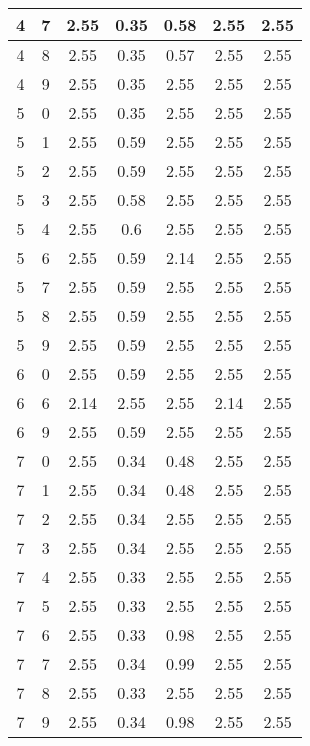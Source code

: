 \begin{longtable}{|c|c||c||c|c||c|c|}
	4 & 7 & 2.55 & 0.35 & 0.58 & 2.55 & 2.55 \\ \hline
	4 & 8 & 2.55 & 0.35 & 0.57 & 2.55 & 2.55 \\ \hline
	4 & 9 & 2.55 & 0.35 & 2.55 & 2.55 & 2.55 \\ \hline
	5 & 0 & 2.55 & 0.35 & 2.55 & 2.55 & 2.55 \\ \hline
	5 & 1 & 2.55 & 0.59 & 2.55 & 2.55 & 2.55 \\ \hline
	5 & 2 & 2.55 & 0.59 & 2.55 & 2.55 & 2.55 \\ \hline
	5 & 3 & 2.55 & 0.58 & 2.55 & 2.55 & 2.55 \\ \hline
	5 & 4 & 2.55 & 0.6 & 2.55 & 2.55 & 2.55 \\ \hline
	5 & 6 & 2.55 & 0.59 & 2.14 & 2.55 & 2.55 \\ \hline
	5 & 7 & 2.55 & 0.59 & 2.55 & 2.55 & 2.55 \\ \hline
	5 & 8 & 2.55 & 0.59 & 2.55 & 2.55 & 2.55 \\ \hline
	5 & 9 & 2.55 & 0.59 & 2.55 & 2.55 & 2.55 \\ \hline
	6 & 0 & 2.55 & 0.59 & 2.55 & 2.55 & 2.55 \\ \hline
	6 & 6 & 2.14 & 2.55 & 2.55 & 2.14 & 2.55 \\ \hline
	6 & 9 & 2.55 & 0.59 & 2.55 & 2.55 & 2.55 \\ \hline
	7 & 0 & 2.55 & 0.34 & 0.48 & 2.55 & 2.55 \\ \hline
	7 & 1 & 2.55 & 0.34 & 0.48 & 2.55 & 2.55 \\ \hline
	7 & 2 & 2.55 & 0.34 & 2.55 & 2.55 & 2.55 \\ \hline
	7 & 3 & 2.55 & 0.34 & 2.55 & 2.55 & 2.55 \\ \hline
	7 & 4 & 2.55 & 0.33 & 2.55 & 2.55 & 2.55 \\ \hline
	7 & 5 & 2.55 & 0.33 & 2.55 & 2.55 & 2.55 \\ \hline
	7 & 6 & 2.55 & 0.33 & 0.98 & 2.55 & 2.55 \\ \hline
	7 & 7 & 2.55 & 0.34 & 0.99 & 2.55 & 2.55 \\ \hline
	7 & 8 & 2.55 & 0.33 & 2.55 & 2.55 & 2.55 \\ \hline
	7 & 9 & 2.55 & 0.34 & 0.98 & 2.55 & 2.55 \\ \hline
\end{longtable}
\clearpage{}
